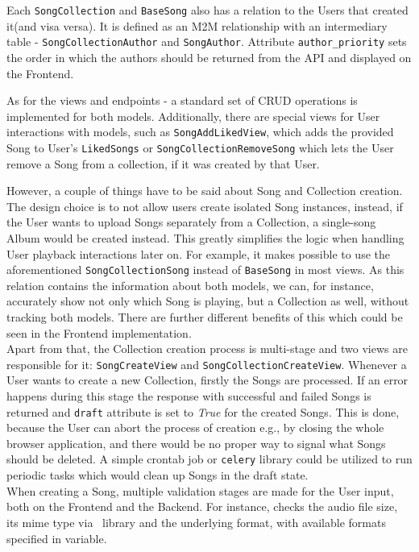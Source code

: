Each \texttt{SongCollection} and \texttt{BaseSong} also has a relation to the Users that created it(and visa versa).
It is defined as an M2M relationship with an intermediary table - \texttt{SongCollectionAuthor} and
\texttt{SongAuthor}. Attribute \texttt{author\_priority} sets the order in which the authors should be returned from
the API and displayed on the Frontend.

As for the views and endpoints - a standard set of CRUD operations is implemented for both models.
Additionally, there are special views for User interactions with models, such as \texttt{SongAddLikedView}, which adds
the provided Song to User's \texttt{LikedSongs} or \texttt{SongCollectionRemoveSong} which lets the User remove a Song
from a collection, if it was created by that User.

However, a couple of things have to be said about Song and Collection creation.
The design choice is to not allow users create isolated Song instances,
instead, if the User wants to upload Songs separately from a Collection, a single-song Album would
be created instead. This greatly simplifies the logic when handling User playback interactions later on.
For example, it makes possible to use the aforementioned \texttt{SongCollectionSong}
instead of \texttt{BaseSong} in most views. As this relation contains the information about both models,
we can, for instance, accurately show not only which Song is playing, but a Collection as well,
without tracking both models.
There are further different benefits of this which could be seen in the Frontend implementation.
\\
Apart from that, the Collection creation process is multi-stage and two views are responsible for it:
\texttt{SongCreateView} and \texttt{SongCollectionCreateView}.
Whenever a User wants to create a new Collection, firstly the Songs are processed.
If an error happens during this stage the response with successful and failed Songs is returned
and \texttt{draft} attribute is set to \textit{True} for the created Songs.
This is done, because the User can abort the process of creation e.g.,
by closing the whole browser application, and there would be no proper way to signal what Songs should be deleted.
A simple crontab job or \texttt{celery} library could be utilized to run periodic tasks which would clean up
Songs in the draft state.
\\
When creating a Song, multiple validation stages are made for the User input, both on the Frontend and the Backend.
For instance,  checks the audio file size, its mime type via~\cite{pythonmagic} library and the
underlying format, with available formats specified in  variable.

